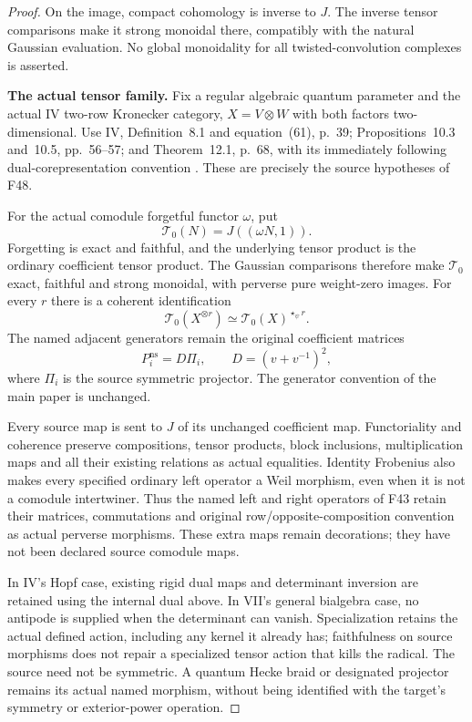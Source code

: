 \documentclass[11pt,a4paper]{article}
\newcommand{\fid}[1]{\textsf{#1}}\newcommand{\gate}[1]{\textsf{#1}}
\theoremstyle{named}\newtheorem{finding}{Finding}[section]
\theoremstyle{definition}\newtheorem{definition}[finding]{Definition}
\theoremstyle{remark}\newtheorem{remark}[finding]{Remark}
\begin{document}
\begin{proof}
On the image, compact cohomology is inverse to $J$.
The inverse tensor comparisons make it strong monoidal
there, compatibly with the natural Gaussian evaluation.
No global monoidality for all twisted-convolution
complexes is asserted.

\par\smallskip\noindent\textbf{The actual tensor family.}\quad
Fix a regular algebraic quantum parameter and the actual
IV two-row Kronecker category, $X=V\otimes W$ with both
factors two-dimensional.
Use IV, Definition~8.1 and equation~(61), p.~39;
Propositions~10.3 and~10.5, pp.~56--57; and
Theorem~12.1, p.~68, with its immediately following
dual-corepresentation convention \cite{IV}.
These are precisely the source hypotheses of \fid{F48}.

For the actual comodule forgetful functor $\omega$, put
\[
 \mathcal T_0(N)=J((\omega N,1)).
\]
Forgetting is exact and faithful, and the underlying
tensor product is the ordinary coefficient tensor
product. The Gaussian comparisons therefore make
$\mathcal T_0$ exact, faithful and strong monoidal,
with perverse pure weight-zero images.
For every $r$ there is a coherent identification
\[
 \mathcal T_0(X^{\otimes r})
       \simeq\mathcal T_0(X)^{\star_\psi r}.
\]
The named adjacent generators remain the original
coefficient matrices
\[
 P_i^{\mathrm{ns}}=D\Pi_i,\qquad
 D=(v+v^{-1})^2,
\]
where $\Pi_i$ is the source symmetric projector.
The generator convention of the main paper is unchanged.

Every source map is sent to $J$ of its unchanged
coefficient map. Functoriality and coherence preserve
compositions, tensor products, block inclusions,
multiplication maps and all their existing relations
as actual equalities.
Identity Frobenius also makes every specified ordinary
left operator a Weil morphism, even when it is not
a comodule intertwiner.
Thus the named left and right operators of \fid{F43}
retain their matrices, commutations and original
row/opposite-composition convention as actual perverse
morphisms. These extra maps remain decorations;
they have not been declared source comodule maps.

In IV's Hopf case, existing rigid dual maps and
determinant inversion are retained using the internal
dual above. In VII's general bialgebra case, no antipode
is supplied when the determinant can vanish.
Specialization retains the actual defined action,
including any kernel it already has; faithfulness
on source morphisms does not repair a specialized
tensor action that kills the radical.
The source need not be symmetric.
A quantum Hecke braid or designated projector remains
its actual named morphism, without being identified
with the target's symmetry or exterior-power operation.


\end{proof}
\end{document}

